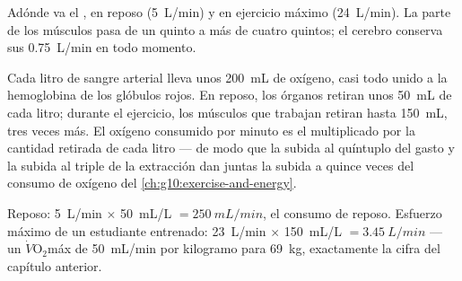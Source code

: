 \begin{omfigure}

{\small Adónde va el , en reposo (\qty{5}{L/min}) y en
ejercicio máximo (\qty{24}{L/min}). La parte de los músculos pasa de un
quinto a más de cuatro quintos; el cerebro conserva sus
\qty{0.75}{L/min} en todo momento.}
\end{omfigure}

\begin{proposition}\label{prop:g10:heart-lungs-effort:extraction}
Cada litro de sangre arterial lleva unos \qty{200}{mL} de oxígeno, casi
todo unido a la hemoglobina de los glóbulos rojos. En reposo, los
órganos retiran unos \qty{50}{mL} de cada litro; durante el ejercicio,
los músculos que trabajan retiran hasta \qty{150}{mL}, tres veces más.
El oxígeno consumido por minuto es el  multiplicado por
la cantidad retirada de cada litro --- de modo que la subida al
quíntuplo del gasto y la subida al triple de la extracción dan juntas
la subida a quince veces del consumo de oxígeno del
\cref{ch:g10:exercise-and-energy}.
\end{proposition}
\admitted

\begin{example}\label{ex:g10:heart-lungs-effort:fick}
Reposo: \qty{5}{L/min} $\times$ \qty{50}{mL/L} $= \qty{250}{mL/min}$,
el consumo de reposo. Esfuerzo máximo de un estudiante entrenado:
\qty{23}{L/min} $\times$ \qty{150}{mL/L} $= \qty{3.45}{L/min}$ --- un
$\dot V\!\mathrm{O_2}$máx de \qty{50}{mL/min} por kilogramo para
\qty{69}{kg}, exactamente la cifra del capítulo anterior.
\end{example}


